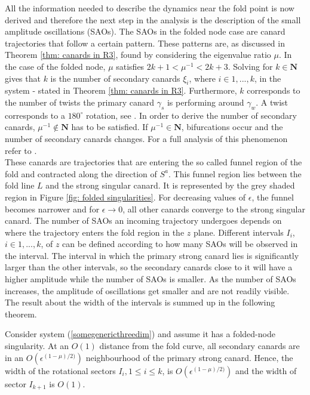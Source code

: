 All the information needed to describe the dynamics near the fold point is now derived and therefore the next step in the analysis is the description of the small amplitude oscillations (SAOs). The SAOs in the folded node case are canard trajectories that follow a certain pattern. These patterns are, as discussed in Theorem \ref{thm: canards in R3}, found by considering the eigenvalue ratio $\mu$.
In the case of the folded node, $\mu$ satisfies $2k+1 < \mu^{-1} < 2k +3 $. Solving for $k \in \mathbf{N}$ gives that $k$ is the number of secondary canards $\xi_i$, where $i \in 1,...,k$, in the system - stated in Theorem \ref{thm: canards in R3}. Furthermore, $k$ corresponds to the number of twists the primary canard $\gamma_s$ is performing around $\gamma_w$. A twist corresponds to a $180^{\circ}$ rotation, see \citet{Kuehn}. In order to derive the number of secondary canards, $\mu^{-1} \notin \mathbf{N}$ has to be satisfied. If $\mu^{-1} \in \mathbf{N}$, bifurcations occur and the number of secondary canards changes. For a full analysis of this phenomenon refer to \citet{wechselberger2005}.\\

These canards are trajectories that are entering the so called funnel region of the fold and contracted along the direction of $S^a$. This funnel region lies between the fold line $L$ and the strong singular canard. It is represented by the grey shaded region in Figure \ref{fig: folded singularities}.
For decreasing values of $\epsilon$, the funnel becomes narrower and for $\epsilon \to 0$, all other canards converge to the strong singular canard.
The number of SAOs an incoming trajectory undergoes depends on where the trajectory enters the fold region in the $z$ plane. Different intervals $I_i$, $i \in 1,...,k$, of $z$ can be defined according to how many SAOs will be observed in the interval.
The interval in which the primary strong canard lies is significantly larger than the other intervals, so the secondary canards close to it will have a higher amplitude while the number of SAOs is smaller. As the number of SAOs increases, the amplitude of oscillations get smaller and are not readily visible.
The result about the width of the intervals is summed up in the following theorem.

\begin{theorem}
Consider system (\ref{somegenericthreedim}) and assume it has a folded-node singularity. At an $O(1)$ distance from the fold curve, all secondary canards are in an $O(\epsilon^{(1- \mu)/2)})$ neighbourhood of the primary strong canard. Hence, the width of the  rotational sectors $I_i, 1 \leq i \leq k$, is $O(\epsilon^{(1- \mu)/2)})$ and the width of sector $I_{k+1}$ is $O(1)$.
\end{theorem}


